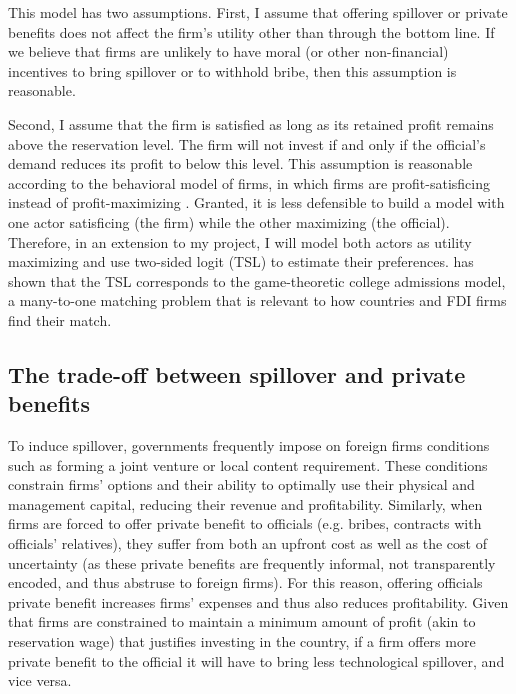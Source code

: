 This model has two assumptions. First, I assume that offering spillover or private benefits does not affect the firm's utility other than through the bottom line. If we believe that firms are unlikely to have moral (or other non-financial) incentives to bring spillover or to withhold bribe, then this assumption is reasonable. 

Second, I assume that the firm is satisfied as long as its retained profit remains above the reservation level. The firm will not invest if and only if the official's demand reduces its profit to below this level. This assumption is reasonable according to the behavioral model of firms, in which firms are profit-satisficing instead of profit-maximizing \citep{Simon1959}. Granted, it is less defensible to build a model with one actor satisficing (the firm) while the other maximizing (the official). Therefore, in an extension to my project, I will model both actors as utility maximizing and use two-sided logit (TSL) to estimate their preferences. \citet{Logan1996a} has shown that the TSL corresponds to the game-theoretic college admissions model, a many-to-one matching problem that is relevant to how countries and FDI firms find their match.


\subsection{The trade-off between spillover and private benefits}

To induce spillover, governments frequently impose on foreign firms conditions such as forming a joint venture or local content requirement. These conditions constrain firms' options and their ability to optimally use their physical and management capital, reducing their revenue and profitability. Similarly, when firms are forced to offer private benefit to officials (e.g. bribes, contracts with officials' relatives), they suffer from both an upfront cost as well as the cost of uncertainty (as these private benefits are frequently informal, not transparently encoded, and thus abstruse to foreign firms). For this reason, offering officials private benefit increases firms' expenses and thus also reduces profitability. Given that firms are constrained to maintain a minimum amount of profit (akin to reservation wage) that justifies investing in the country, if a firm offers more private benefit to the official it will have to bring less technological spillover, and vice versa.

